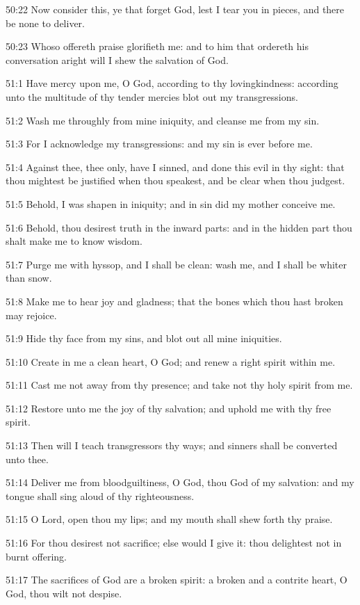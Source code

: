 50:22 Now consider this, ye that forget God, lest I tear you in
pieces, and there be none to deliver.

50:23 Whoso offereth praise glorifieth me: and to him that ordereth
his conversation aright will I shew the salvation of God.



51:1 Have mercy upon me, O God, according to thy lovingkindness:
according unto the multitude of thy tender mercies blot out my
transgressions.

51:2 Wash me throughly from mine iniquity, and cleanse me from my sin.

51:3 For I acknowledge my transgressions: and my sin is ever before
me.

51:4 Against thee, thee only, have I sinned, and done this evil in thy
sight: that thou mightest be justified when thou speakest, and be
clear when thou judgest.

51:5 Behold, I was shapen in iniquity; and in sin did my mother
conceive me.

51:6 Behold, thou desirest truth in the inward parts: and in the
hidden part thou shalt make me to know wisdom.

51:7 Purge me with hyssop, and I shall be clean: wash me, and I shall
be whiter than snow.

51:8 Make me to hear joy and gladness; that the bones which thou hast
broken may rejoice.

51:9 Hide thy face from my sins, and blot out all mine iniquities.

51:10 Create in me a clean heart, O God; and renew a right spirit
within me.

51:11 Cast me not away from thy presence; and take not thy holy spirit
from me.

51:12 Restore unto me the joy of thy salvation; and uphold me with thy
free spirit.

51:13 Then will I teach transgressors thy ways; and sinners shall be
converted unto thee.

51:14 Deliver me from bloodguiltiness, O God, thou God of my
salvation: and my tongue shall sing aloud of thy righteousness.

51:15 O Lord, open thou my lips; and my mouth shall shew forth thy
praise.

51:16 For thou desirest not sacrifice; else would I give it: thou
delightest not in burnt offering.

51:17 The sacrifices of God are a broken spirit: a broken and a
contrite heart, O God, thou wilt not despise.

